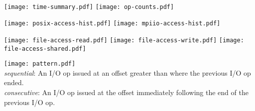 \documentclass[11pt,letterpaper,twocolumn]{article}
\begin{document}
\selectfont

\pagestyle{fancy}

\begin{figure*}[!h]
\centering
\subfigure
{
    
}\\
\subfigure
{
    \texttt{[image: time-summary.pdf]}
}
\subfigure
{
    \texttt{[image: op-counts.pdf]}
}
\end{figure*}

\begin{figure*}[!h]
\centering
\subfigure
{
    \texttt{[image: posix-access-hist.pdf]}
}
\ifdefined\inclmpiio
\subfigure
{
    \texttt{[image: mpiio-access-hist.pdf]}
}
\fi
\end{figure*}

\begin{figure*}[!h]
\centering
\subfigure
{
    
}
\subfigure
{
    
}
\end{figure*}

\begin{figure*}[!h]
\centering
\subfigure
{
    \texttt{[image: file-access-read.pdf]}
}
\subfigure
{
    \texttt{[image: file-access-write.pdf]}
}
\subfigure
{
    \texttt{[image: file-access-shared.pdf]}
}
\subfigure
{
    
}
\subfigure
{
    
}
\end{figure*}

\begin{figure*}[!h]
\centering
\subfigure
{
    \texttt{[image: pattern.pdf]}
}
\scriptsize
\\ \textit{sequential}: An I/O op issued at an offset greater than where the previous I/O op ended.
\\ \textit{consecutive}: An I/O op issued at the offset immediately following the end of the previous I/O op. \\
\normalsize
\subfigure
{
    
}
\end{figure*}
\end{document}
